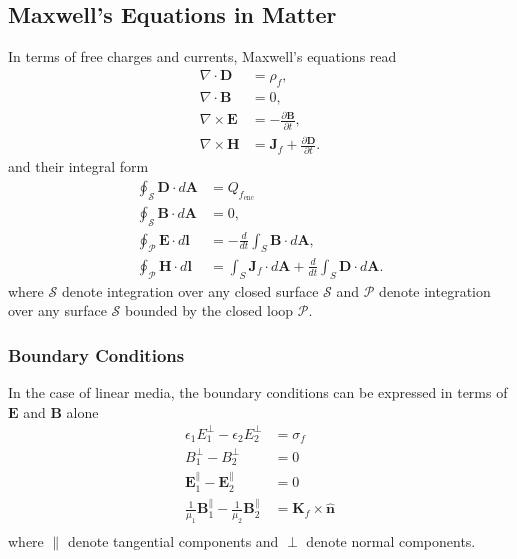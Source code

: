 \documentclass[../../../main.tex]{subfiles}
\begin{document}
\subsection{Maxwell’s Equations in Matter}
In terms of free charges and currents, Maxwell’s equations read
\begin{align*}
    \nabla \cdot \mathbf{D}  & = \rho_f,                                                \\
    \nabla \cdot \mathbf{B}  & = 0,                                                     \\
    \nabla \times \mathbf{E} & = -\frac{\partial \mathbf{B}}{\partial t},               \\
    \nabla \times \mathbf{H} & = \mathbf{J}_f + \frac{\partial \mathbf{D}}{\partial t}.
\end{align*}
and their integral form
\begin{align*}
    \oint_{\mathcal{S}} \mathbf{D} \cdot d\mathbf{A} & = Q_{f_\text{enc}}                                                                          \\
    \oint_{\mathcal{S}} \mathbf{B} \cdot d\mathbf{A} & = 0,                                                                                        \\
    \oint_{\mathcal{P}} \mathbf{E} \cdot d\mathbf{l} & = -\frac{d}{dt} \int_S \mathbf{B} \cdot d\mathbf{A},                                        \\
    \oint_{\mathcal{P}} \mathbf{H} \cdot d\mathbf{l} & = \int_S \mathbf{J}_f \cdot d\mathbf{A} + \frac{d}{dt} \int_S \mathbf{D} \cdot d\mathbf{A}.
\end{align*}
where $\mathcal{S}$ denote integration over any closed surface $\mathcal{S}$ and $\mathcal{P }$ denote integration over any surface $\mathcal{S }$ bounded by the closed loop $\mathcal{P}$.

\subsubsection{Boundary Conditions}
In the case of linear media, the boundary conditions can be expressed in terms of $\mathbf{E}$ and $\mathbf{B}$ alone
\begin{align*}
    \epsilon_1 E_1^{\perp} - \epsilon_2 E_2^{\perp}                                     & =  \sigma_f                             \\
    {B}_1^{\perp} - {B}_2^{\perp}                                         & =  0                                    \\
    \mathbf{E}_1^{\parallel} - \mathbf{E}_2^{\parallel}                                 & =  0                                    \\
    \frac{1}{\mu_1} \mathbf{B}_1^{\parallel} - \frac{1}{\mu_2} \mathbf{B}_2^{\parallel} & =  \mathbf{K}_f \times \hat{\mathbf{n}} \\
\end{align*}
where $\parallel$ denote tangential components and $\perp$ denote normal components.
\end{document}
